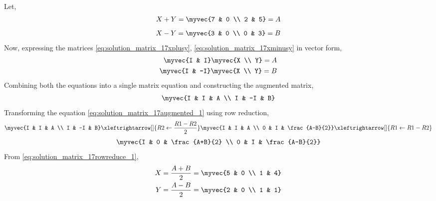 Let,
\begin{align} \label{eq:solution_matrix_17xplusy}
    X+Y=\myvec{7 & 0 \\ 2 & 5} = A
\end{align}
\begin{align} \label{eq:solution_matrix_17xminusy}
    X-Y=\myvec{3 & 0 \\ 0 & 3} = B
\end{align}
Now, expressing the matrices \eqref{eq:solution_matrix_17xplusy}, \eqref{eq:solution_matrix_17xminusy} in vector form, 
\begin{align}
    \myvec{I & I} \myvec{X \\ Y} = A \nonumber\\
    \myvec{I & -I} \myvec{X \\ Y} = B \nonumber
\end{align}
Combining both the equations into a single matrix equation and constructing the augmented matrix,
\begin{align} \label{eq:solution_matrix_17augmented_1}
    \myvec{I & I & A \\ I & -I & B} 
\end{align}
Transforming the equation \eqref{eq:solution_matrix_17augmented_1} using row reduction,
\begin{align}
    \myvec{I & I & A \\ I & -I & B} \xleftrightarrow[]{R2\leftarrow\frac{R1-R2}{2}} \myvec{I & I & A \\ 0 & I & \frac{A-B}{2}} \xleftrightarrow[]{R1\leftarrow R1-R2} \nonumber
\end{align}
\begin{align} \label{eq:solution_matrix_17rowreduce_1}
    \myvec{I & 0 & \frac{A+B}{2} \\ 0 & I & \frac{A-B}{2}}
\end{align}
From \eqref{eq:solution_matrix_17rowreduce_1},
\begin{align}
    X = \frac{A+B}{2} = \myvec{5 & 0 \\ 1 & 4} \\
    Y = \frac{A-B}{2} = \myvec{2 & 0 \\ 1 & 1}
\end{align}

